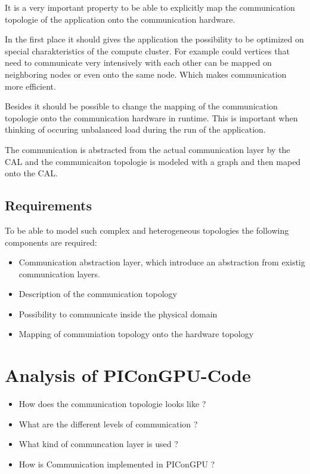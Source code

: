 It is a very important property to be able to explicitly map the
communication topologie of the application onto the communication
hardware.

In the first place it should gives the application the possibility to
be optimized on special charakteristics of the compute cluster. For
example could vertices that need to communicate very intensively with
each other can be mapped on neighboring nodes or even onto the same
node. Which makes communication more efficient.

Besides it should be possible to change the mapping of the
communication topologie onto the communication hardware in
runtime. This is important when thinking of occuring unbalanced load
during the run of the application.

The communication is abstracted from the actual communication layer by
the CAL and the communicaiton topologie is modeled with a graph and
then maped onto the CAL.

\subsection{Requirements}
To be able to model such complex and heterogeneous topologies the
following components are required:

\begin{itemize}
\item Communication abstraction layer, which introduce an abstraction
  from existig communication layers.
\item Description of the communication topology
\item Possibility to communicate inside the physical domain
\item Mapping of communiation topology onto the hardware topology
\end{itemize}

\section{Analysis of PIConGPU-Code}
\begin{itemize}
  \item How does the communication topologie looks like ?
  \item What are the different levels of communication ?
  \item What kind of communcation layer is used ?
  \item How is Communication implemented in PIConGPU ?
\end{itemize}

